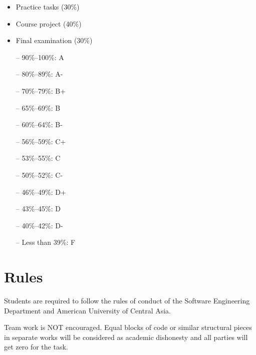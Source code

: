 \documentclass[12pt,a4paper,oneside]{article}
\begin{document}
        \begin{itemize}
            \item Practice tasks (30\%)
            \item Course project (40\%)
            \item Final examination (30\%)
        \end{itemize}

        \begin{itemize} \itemsep-10pt \parskip0pt 
            \item[--] 90\%--100\%: A\\
            \item[--] 80\%--89\%: A-\\
            \item[--] 70\%--79\%: B+\\
            \item[--] 65\%--69\%: B\\
            \item[--] 60\%--64\%: B-\\
            \item[--] 56\%--59\%: C+\\
            \item[--] 53\%--55\%: C\\
            \item[--] 50\%--52\%: C-\\
            \item[--] 46\%--49\%: D+\\
            \item[--] 43\%--45\%: D\\
            \item[--] 40\%--42\%: D-\\
            \item[--] Less than 39\%: F
        \end{itemize}

    \section{Rules}

        Students are required to follow the rules of conduct of the Software
        Engineering Department and American University of Central Asia.

        Team work is NOT encouraged. Equal blocks of code or similar structural
        pieces in separate works will be considered as academic dishonesty and
        all parties will get zero for the task.
\end{document}
